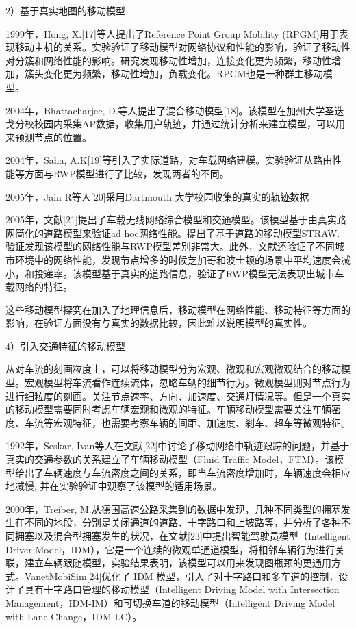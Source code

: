  2）基于真实地图的移动模型
 
 1999年，Hong, X.[17]等人提出了Reference Point Group Mobility (RPGM)用于表现移动主机的关系。实验验证了移动模型对网络协议和性能的影响，验证了移动性对分簇和网络性能的影响。研究发现移动性增加，连接变化更为频繁，移动性增加，簇头变化更为频繁，移动性增加，负载变化。RPGM也是一种群主移动模型。

2004年，Bhattacharjee, D.等人提出了混合移动模型[18]。该模型在加州大学圣迭戈分校校园内采集AP数据，收集用户轨迹，并通过统计分析来建立模型，可以用来预测节点的位置。

2004年，Saha, A.K[19]等引入了实际道路，对车载网络建模。实验验证从路由性能等方面与RWP模型进行了比较，发现两者的不同。

2005年，Jain R等人[20]采用Dartmouth 大学校园收集的真实的轨迹数据

2005年，文献[21]提出了车载无线网络综合模型和交通模型。该模型基于由真实路网简化的道路模型来验证ad hoc网络性能。提出了基于道路的移动模型STRAW. 验证发现该模型的网络性能与RWP模型差别非常大。此外，文献还验证了不同城市环境中的网络性能，发现节点增多的时候芝加哥和波士顿的场景中平均速度会减小，和投递率。该模型基于真实的道路信息，验证了RWP模型无法表现出城市车载网络的特征。

这些移动模型探究在加入了地理信息后，移动模型在网络性能、移动特征等方面的影响，在验证方面没有与真实的数据比较，因此难以说明模型的真实性。
 
4）引入交通特征的移动模型

从对车流的刻画粒度上，可以将移动模型分为宏观、微观和宏观微观结合的移动模型。宏观模型将车流看作连续流体，忽略车辆的细节行为。微观模型则对节点行为进行细粒度的刻画。关注节点速率、方向、加速度、交通灯情况等。但是一个真实的移动模型需要同时考虑车辆宏观和微观的特征。车辆移动模型需要关注车辆密度、车流等宏观特征，也需要考察车辆的间距、加速度、刹车、超车等微观特征。

1992年，Seskar, Ivan等人在文献[22]中讨论了移动网络中轨迹跟踪的问题，并基于真实的交通参数的关系建立了车辆移动模型（Fluid Traffic Model，FTM）。该模型给出了车辆速度与车流密度之间的关系，即当车流密度增加时，车辆速度会相应地减慢, 并在实验验证中观察了该模型的适用场景。

2000年，Treiber, M.从德国高速公路采集到的数据中发现，几种不同类型的拥塞发生在不同的地段，分别是关闭通道的道路、十字路口和上坡路等，并分析了各种不同拥塞以及混合型拥塞发生的状况，在文献[23]中提出智能驾驶员模型（Intelligent Driver Model，IDM），它是一个连续的微观单通道模型，将相邻车辆行为进行关联，建立车辆跟随模型，实验结果表明，该模型可以用来发现图瓶颈的更通用方式。VanetMobiSim[24]优化了 IDM 模型，引入了对十字路口和多车道的控制，设计了具有十字路口管理的移动模型（Intelligent  Driving  Model  with Intersection Management，IDM-IM）和可切换车道的移动模型（Intelligent Driving Model with Lane Change，IDM-LC）。


